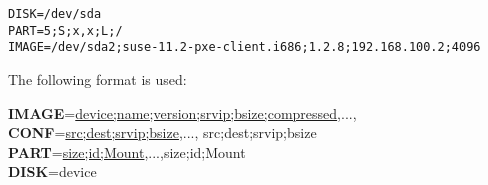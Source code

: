 \begin{verbatim}
DISK=/dev/sda
PART=5;S;x,x;L;/
IMAGE=/dev/sda2;suse-11.2-pxe-client.i686;1.2.8;192.168.100.2;4096
\end{verbatim}

The following format is used:

\begin{Command}{14cm}
    \textbf{IMAGE}=\underline{device;name;version;srvip;bsize;compressed},...,\\
    \textbf{CONF}=\underline{src;dest;srvip;bsize},...,
                             src;dest;srvip;bsize\\
    \textbf{PART}=\underline{size;id;Mount},...,size;id;Mount\\
    \textbf{DISK}=device
\end{Command}

